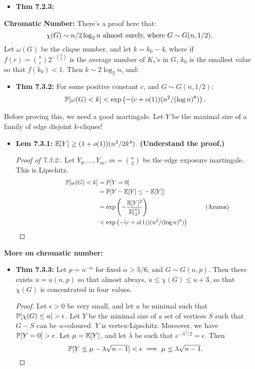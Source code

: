 \documentclass[11pt]{article}
\newenvironment{INT}[1][]{\begin{itemize}\small\item\textbf{#1}}{\end{itemize}}
\begin{document}
\begin{chapter7}
\begin{itemise}
\begin{INT}[Thm 7.2.3:]
\end{INT}
\item \textbf{Chromatic Number:} There's a proof here that:
\[\chi(G)\sim n/2\log_2n\textup{ almost surely, where $G\sim G(n,1/2)$}.\]
Let $\omega(G)$ be the clique number, and let $k=k_0-4$, where if $f(r)={n\choose r}2^{-{k\choose2}}$ is the average number of $K_r$'s in $G$, $k_0$ is the smallest value so that $f(k_0)<1$. Then $k\sim 2\log_2n$, and:
\begin{INT}[Thm 7.3.2:]
For some positive constant $c$, and $G\sim G(n,1/2)$:
\[\operatorname{\mathbb{P}}[\omega(G)<k]<\exp\left({-(c+o(1))(n^2/(\log n)^8)}\right).\]
\end{INT}
Before proving this, we need a good martingale. Let $Y$ be the maximal size of a family of edge disjoint $k$-cliques!
\begin{INT}[Lem 7.3.1:]
$\operatorname{\mathbb{E}}[Y]\geq(1+o(1))(n^2/2k^4)$. \textbf{(Understand the proof.)}
\begin{proof}[Proof of 7.3.2:]
Let $Y_0,\ldots,Y_m$, $m={n\choose2}$ be the edge exposure martingale. This is Lipschitz.
\begin{alignat*}{2}
 \qquad \qquad \qquad \qquad \Prob[\omega(G)<k]&=\Prob[Y=0]%
\\&=\Prob[Y-\Exp[Y]\leq-\Exp[Y]]%
\\&=\exp\left(-\frac{\Exp[Y]^2}{2{n\choose 2}}\right)&\qquad&\text{(Azuma)}
\\&<\exp\left({-(c+o(1))(n^2/(\log n)^8)}\right)&& \quad \qquad \qquad \qquad \qquad \qedhere%
\end{alignat*}
\end{proof}
\end{INT}
\item \textbf{More on chromatic number:}
\begin{INT}[Thm 7.3.3:]
Let $p=n^{-\alpha}$ for fixed $\alpha>5/6$, and $G\sim G(n,p)$. Then there exists $u=u(n,p)$ so that almost always, $u\leq\chi(G)\leq u+3$, so that $\chi(G)$ is concentrated in four values.
\begin{proof}
Let $\epsilon>0$ be very small, and let $u$ be minimal such that $\operatorname{\mathbb{P}}[\chi(G)\leq u]>\epsilon$. Let $Y$ be the minimal size of a set of vertices $S$ such that $G-S$ can be $u$-coloured. $Y$ is vertex-Lipschitz. Moreover, we have $\operatorname{\mathbb{P}}[Y=0]>\epsilon$. Let $\mu=\operatorname{\mathbb{E}}[Y]$, and let $\lambda$ be such that $e^{-\lambda^2/2}=\epsilon$. Then
\[\operatorname{\mathbb{P}}[Y\leq\mu-\lambda\sqrt{n-1}]<\epsilon\implies\mu\leq\lambda\sqrt{n-1}.\]

\end{proof}
\end{INT}
\end{itemise}
\end{chapter7}
\end{document}
